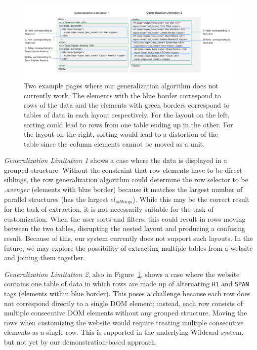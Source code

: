 \documentclass[sigconf,10pt]{acmart}
\begin{document}
\begin{figure}
  \includegraphics[width=\textwidth]{media/limitations.png}
  \caption{\label{fig:limitations} Two example pages where our generalization algorithm does not currently work. The elements with the blue border correspond to rows of the data and the elements with green borders correspond to tables of data in each layout respectively. For the layout on the left, sorting could lead to rows from one table ending up in the other. For the layout on the right, sorting would lead to a distortion of the table since the column elements cannot be moved as a unit.}
\end{figure}

\emph{Generalization Limitation 1} shows a case where the data is
displayed in a grouped structure. Without the constraint that row
elements have to be direct siblings, the row generalization algorithm
could determine the row selector to be \emph{.avenger} (elements with
blue border) because it matches the largest number of parallel
structures (has the largest \(el_{siblings}\)). While this may be the
correct result for the task of extraction, it is not necessarily
suitable for the task of customization. When the user sorts and filters,
this could result in rows moving between the two tables, disrupting the
nested layout and producing a confusing result. Because of this, our
system currently does not support such layouts. In the future, we may
explore the possibility of extracting multiple tables from a website and
joining them together.

\emph{Generalization Limitation 2}, also in
Figure~\ref{fig:limitations}, shows a case where the website contains
one table of data in which rows are made up of alternating \texttt{H1}
and \texttt{SPAN} tags (elements within blue border). This poses a
challenge because each row does not correspond directly to a single DOM
element; instead, each row consists of multiple consecutive DOM elements
without any grouped structure. Moving the rows when customizing the
website would require treating multiple consecutive elements as a single
row. This is supported in the underlying Wildcard system, but not yet by
our demonstration-based approach.
\end{document}
